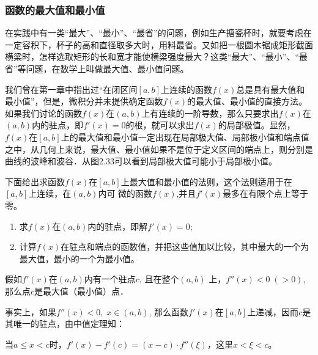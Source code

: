 \subsubsection{函数的最大值和最小值}
在实践中有一类“最大”、“最小”、“最省”的问题，例如生产搪瓷杯时，就要考虑在一定容积下，杯子的高和直径取多大时，用料最省。又如把一根圆木锯成矩形截面横梁时，怎样选取矩形的长和宽才能使横梁强度最大？这类“最大”、“最小”、“最省”等问题，在数学上叫做最大值、最小值问题。

我们曾在第一章中指出过“在闭区间$[a,b]$上连续的函数$f(x)$总是具有最大值和最小值”，但是，微积分并未提供确定函数$f(x)$的最大值、最小值的直接方法。如果我们讨论的函数$f(x)$在$(a,b)$上有连续的一阶导数，那么只要求出$f(x)$在$(a,b)$内的驻点，即$f'(x)=0$的根，就可以求出$f(x)$的局部极值。显然，$f(x)$在$[a,b]$上的最大值和最小值一定出现在局部极大值、局部极小值和端点值之中，从几何上来说，最大值、最小值如果不是位于定义区间的端点上，则分别是曲线的波峰和波谷．从图2.33可以看到局部极大值可能小于局部极小值。

\begin{figure}[htp]
    \centering
{}
    \caption{}
\end{figure}

下面给出求函数$f(x)$在$[a,b]$上最大值和最小值的法则，这个法则适用于在$[a,b]$上连续，在$(a,b)$内可
微的函数$f(x)$,并且$f'(x)$最多在有限个点上等于零。
\begin{enumerate}
    \item 求$f(x)$在$(a,b)$内的驻点，即解$f'(x)=0$;
    \item 计算$f(x)$在驻点和端点的函数值，并把这些值加以比较，其中最大的一个为最大值，最小的一个为最小值。
\end{enumerate}

假如$f'(x)$在$(a,b)$内有一个驻点$c$, 且在整个$(a,b)$
上，$f''(x)<0\; (>0)$, 那么点$c$是最大值（最小值）点．

事实上，如果$f''(x)<0,\; x\in (a,b)$, 那么函数$f'(x)$在$[a,b]$上递减，因而$c$是其唯一的驻点，由中值定理知：

当$a\le x<c$时，$f'(x)-f'(c)=(x-c)\cdot f''(\xi)$，这里$x<\xi<c$。

